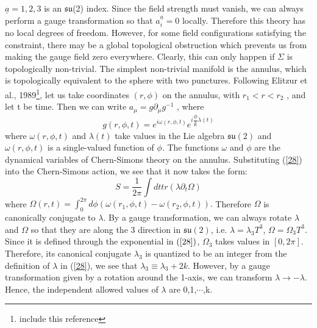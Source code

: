 $\underline{a} = 1,2,3$ is an $\mathfrak{su}$(2) index. Since the field strength must vanish, we can 
always perform a gauge transformation so that $a^{\underline{a}}_{i} = 0$ locally. Therefore this theory has 
no local degrees of freedom. 
However, for some field configurations satisfying the constraint,
there may be a global topological obstruction which prevents
us from making the gauge field zero everywhere. Clearly, this
can only happen if $\Sigma$ is topologically non-trivial.
The simplest non-trivial manifold is the annulus, which is
topologically equivalent to the sphere with two punctures.
Following Elitzur et al., 1989\footnote{include this reference}, let us take coordinates
$(r, \phi)$ on the annulus, with $r_1 \lt r \lt r_{2}$ , and let t be time.
Then we can write $a_\mu = g\partial_{\mu}g^{-1}$ , where
\begin{equation}\label{28} 
 g(r,\phi,t)= e^{i\omega(r,\phi,t)}e^{i \dfrac{\phi}{k}\lambda{(t)}}
\end{equation}
where $\omega(r,\phi,t)$ and $\lambda{(t)}$ take values in the Lie algebra $\mathfrak{su}(2)$
and $\omega(r,\phi,t)$ is a single-valued function of $\phi$. The functions $\omega$ and $\phi$
are the dynamical variables of Chern-Simons theory on the annulus. Substituting (\ref{28})
into the Chern-Simons action, we see that it now takes the form:
\begin{equation}\label{29}
 S = \dfrac{1}{2\pi}\int dt tr(\lambda \partial_{t} \Omega)
\end{equation}
where $\Omega(r,t) = \int^{2\pi}_{0} d\phi (\omega(r_1,\phi,t) - \omega(r_2, \phi,t)).$ Therefore $\Omega$ 
is canonically conjugate to $\lambda$. By a gauge transformation, we can always rotate $\lambda$ and $\Omega$ so that they
are along the 3 direction in $\mathfrak{su}(2)$, i.e. $\lambda = \lambda_3 T^3$, $\Omega = \Omega_3 T^3$.
  Since it is defined through the exponential in $(\ref{28})$, $\Omega_3$ takes values in $[0,2\pi].$
 Therefore, its canonical conjugate $\lambda_3$ is quantized to be an integer from the definition of $\lambda$ in (\ref{28}),
 we see that $\lambda_3 \equiv  \lambda_3 + 2k.$ However, by a gauge transformation given by a rotation around the 1-axis, we 
 can transform $\lambda \rightarrow -\lambda$. Hence, the independent allowed values of $\lambda$ are 0,1,$\cdots$,k.
